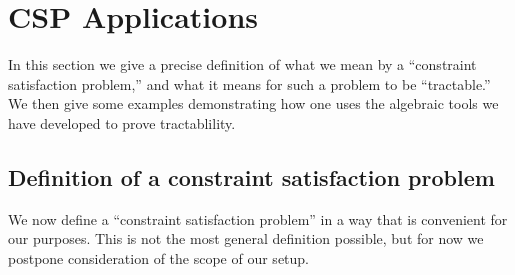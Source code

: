 


\section{CSP Applications}
\label{sec:applications}
In this section we give a precise definition of what we mean by a ``constraint
satisfaction problem,'' and what it means for such a problem to be ``tractable.''
We then give some examples demonstrating how one uses the algebraic tools we
have developed to prove tractablility.



\subsection{Definition of a constraint satisfaction problem}
\label{sec:defin-constr-satisf}


We now define a ``constraint satisfaction problem'' in a way that is convenient
for our purposes. This is not the most general definition possible, but for now
we postpone consideration of the scope of our setup.

